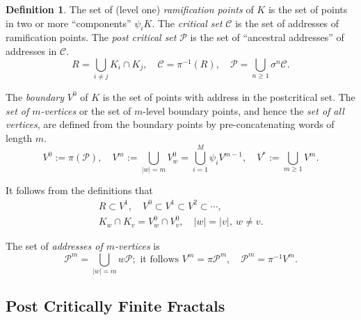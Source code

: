 \documentclass[a4paper]{amsart}
\theoremstyle{plain}
\theoremstyle{definition}
\newtheorem{definition}[theorem]{Definition}%
\theoremstyle{remark}
\begin{document}
\begin{definition} The set of (level one) \emph{ramification points} of $ K $ is the set of points in two or more ``components'' $ \psi_i K $. 
The \emph{critical set} $ \mathcal{C} $ is the  set of addresses of ramification points.
The \emph{post critical set} $  \mathcal{P} $ is the set of ``ancestral addresses'' of addresses in $ \mathcal{C}$.
\begin{equation}   \label{dfpcs}
\boxed{R = \bigcup_{i\neq j} K_i \cap K_j ,\quad   \mathcal{C} = \pi^{-1}(R),\quad  
\mathcal{P} = \bigcup_{n\geq 1} \sigma^n \mathcal{C} .}
\end{equation} 

The \emph{boundary} $ V^{0} $ of $ K $ is the set of points with address in the postcritical set.    The \emph{set of $m$-vertices} or the set of $ m $-level boundary points, and hence the \emph{set of all vertices}, are defined from the boundary points by pre-concatenating words of length $ m $.
\begin{equation} \label{defvn}
\boxed{ V^{0} := \pi (\mathcal{P}), \quad  
V^{m}   :=  \bigcup_{|w|=m} V_w^{0} =    \bigcup_{i=1}^M   \psi_i V^{m-1},
          \quad V^* := \bigcup_{m\geq 1} V^{m} .}
\end{equation}


\medskip It follows from the definitions that 
\begin{gather}
R \subset V^{1}, \quad V^{0}  \subset V^{1}  \subset V^{2} \subset \cdots, \\
\boxed{ K_w \cap K_v = V_w^{0}\cap V_v^{0}}, \quad |w|=|v|,\ w \neq v. \label{kvi}
  \end{gather}
  
The set of \emph{addresses of $ m $-vertices} is 
\begin{equation} \label{}
\boxed{ \mathcal{P} ^{m} = \bigcup_{|w|=m } w \mathcal{P}}; \text{ it follows } 
 \boxed{ V^{m} = \pi \mathcal{P} ^{m},\quad   \mathcal{P} ^{m} = \pi^{-1} V^{m} }.
\end{equation} 
 \end{definition}  
  




  

\subsection{Post Critically Finite Fractals}  \label{secpcf} 
\end{document}
